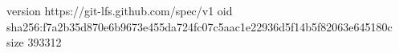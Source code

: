 version https://git-lfs.github.com/spec/v1
oid sha256:f7a2b35d870e6b9673e455da724fc07c5aac1e22936d5f14b5f82063e645180c
size 393312
